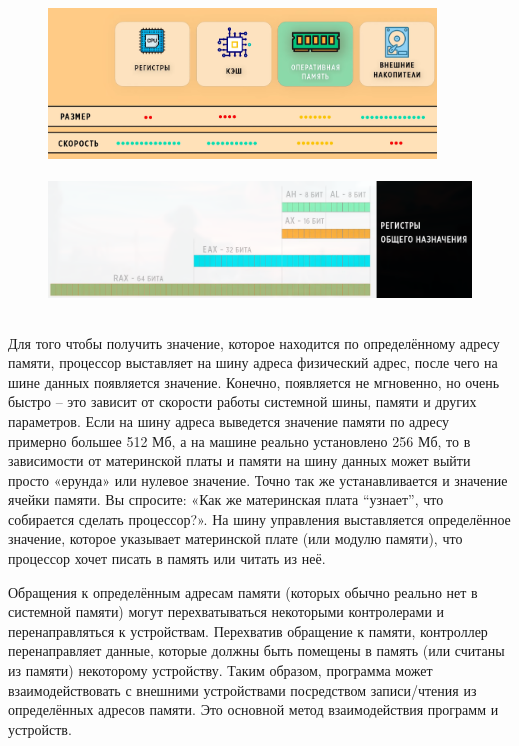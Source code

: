 	\begin{figure}[h]
		\centering
		\begin{minipage}{0.45\textwidth}
			\centering
			\includegraphics[height=4cm]{img/1.6} 
			\captionsetup{font=footnotesize} 
			\caption*{} 
		\end{minipage}
		\hfill
		\begin{minipage}{0.55\textwidth}
			\centering
			\includegraphics[height=4cm]{img/2.5} 
			\captionsetup{font=footnotesize} 
			\caption*{} 
		\end{minipage}
	\end{figure}
	
	\par Для того чтобы получить значение, которое находится по определённому
	адресу памяти, процессор выставляет на шину адреса физический адрес, после чего на шине данных появляется значение. Конечно, появляется не мгновенно, но очень быстро – это зависит от скорости работы системной шины, памяти и других параметров. Если на шину адреса выведется значение памяти по адресу примерно большее 512 Мб, а на машине реально установлено 256 Мб, то в зависимости от материнской платы и памяти на шину данных может выйти просто «ерунда» или нулевое значение. Точно так же устанавливается и значение ячейки памяти. Вы спросите: «Как же материнская плата “узнает”, что собирается сделать процессор?». На шину управления выставляется определённое значение, которое указывает материнской плате (или модулю памяти), что процессор хочет писать в память или читать из неё.
	
	\par Обращения к определённым адресам памяти (которых обычно реально нет в системной памяти) могут перехватываться некоторыми контролерами и перенаправляться к устройствам. Перехватив обращение к памяти, контроллер перенаправляет данные, которые должны быть помещены в память (или считаны из памяти) некоторому устройству. Таким образом, программа может взаимодействовать с внешними устройствами посредством записи/чтения из определённых адресов памяти. Это основной метод взаимодействия программ и устройств.
	
